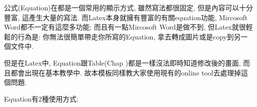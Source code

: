 

公式(Equation)在都是一個常用的顯示方式, 雖然寫法都很固定, 但是內容可以十分豐富, 這產生大量的寫法. 而Latex本身就擁有豐富的有關equation功能, Mircosoft Word都不一定有這麼多功能; 而且有一點Mircosoft Word是做不到, 但Latex就很輕鬆的行為是: 你無法很簡單帶走你所寫的Equation, 拿去轉成圖片或是copy到另一個文件中.

但是在Latex中, Equation跟Table(Chap )都是一樣沒法即時知道修改後的畫面, 而且都會出現在基本教學中. 故本模板同樣教大家使用現有的online tool去處理掉這個問題.

{}
Equation有2種使用方式:

